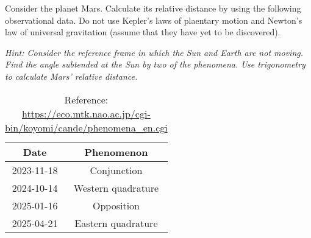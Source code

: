 \documentclass[main.tex]{subfiles}
\begin{document}
\begin{q}{1}
Consider the planet Mars. Calculate its relative distance by using the following observational data. Do not use Kepler's laws of plaentary motion and Newton's law of universal gravitation (assume that they have yet to be discovered).

\noindent\textit{Hint: Consider the reference frame in which the Sun and Earth are not moving. Find the angle subtended at the Sun by two of the phenomena. Use trigonometry to calculate Mars' relative distance.}

\begin{table}[h!]
    \centering
    \begin{tabular}{|c|c|}
    \hline
    \textbf{Date} & \textbf{Phenomenon} \\
    \hline
    2023-11-18 & Conjunction \\
    2024-10-14 & Western quadrature \\
    2025-01-16 & Opposition \\
    2025-04-21 & Eastern quadrature \\
    \hline
    \end{tabular}
    \caption*{Reference: \href{https://eco.mtk.nao.ac.jp/cgi-bin/koyomi/cande/phenomena_en.cgi}{https://eco.mtk.nao.ac.jp/cgi-bin/koyomi/cande/phenomena\_en.cgi}}
    \end{table}
\end{q}

\begin{sol}

\end{sol}
\end{document}
